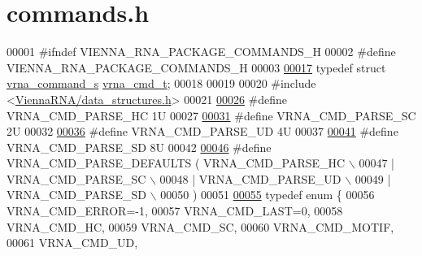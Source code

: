 \hypertarget{commands_8h_source}{}\section{commands.\+h}
\label{commands_8h_source}

\begin{DoxyCode}
00001 \textcolor{preprocessor}{#ifndef VIENNA\_RNA\_PACKAGE\_COMMANDS\_H}
00002 \textcolor{preprocessor}{#define VIENNA\_RNA\_PACKAGE\_COMMANDS\_H}
00003 
\hypertarget{commands_8h_source.tex_l00017}{}\hyperlink{group__file__utils_ga92cb3b5952352b103bcb32e5a99e0e5a}{00017} \textcolor{keyword}{typedef} \textcolor{keyword}{struct }\hyperlink{structvrna__command__s}{vrna\_command\_s} \hyperlink{structvrna__command__s}{vrna\_cmd\_t};
00018 
00019 
00020 \textcolor{preprocessor}{#include <\hyperlink{data__structures_8h}{ViennaRNA/data\_structures.h}>}
00021 
\hypertarget{commands_8h_source.tex_l00026}{}\hyperlink{commands_8h_ac54dec838d7b6bebd5df85f71702d324}{00026} \textcolor{preprocessor}{#define VRNA\_CMD\_PARSE\_HC      1U}
00027 
\hypertarget{commands_8h_source.tex_l00031}{}\hyperlink{commands_8h_a8cad3c1f83e6f149829c49a186a83e21}{00031} \textcolor{preprocessor}{#define VRNA\_CMD\_PARSE\_SC      2U}
00032 
\hypertarget{commands_8h_source.tex_l00036}{}\hyperlink{commands_8h_a6c6409780698826b04ebfed9151d7649}{00036} \textcolor{preprocessor}{#define VRNA\_CMD\_PARSE\_UD      4U}
00037 
\hypertarget{commands_8h_source.tex_l00041}{}\hyperlink{commands_8h_af5e20210173cdb83bf70256a454f284b}{00041} \textcolor{preprocessor}{#define VRNA\_CMD\_PARSE\_SD      8U}
00042 
\hypertarget{commands_8h_source.tex_l00046}{}\hyperlink{commands_8h_a0a6c88e21e366dca14958d69cd024008}{00046} \textcolor{preprocessor}{#define VRNA\_CMD\_PARSE\_DEFAULTS (   VRNA\_CMD\_PARSE\_HC \(\backslash\)}
00047 \textcolor{preprocessor}{                                  | VRNA\_CMD\_PARSE\_SC \(\backslash\)}
00048 \textcolor{preprocessor}{                                  | VRNA\_CMD\_PARSE\_UD \(\backslash\)}
00049 \textcolor{preprocessor}{                                  | VRNA\_CMD\_PARSE\_SD \(\backslash\)}
00050 \textcolor{preprocessor}{                                )}
00051 
\hypertarget{commands_8h_source.tex_l00055}{}\hyperlink{commands_8h_a2ea3e452bf3b3f3ca513b3b081a86137}{00055} \textcolor{keyword}{typedef} \textcolor{keyword}{enum} \{
00056   VRNA\_CMD\_ERROR=-1,
00057   VRNA\_CMD\_LAST=0,
00058   VRNA\_CMD\_HC,
00059   VRNA\_CMD\_SC,
00060   VRNA\_CMD\_MOTIF,
00061   VRNA\_CMD\_UD,

\end{DoxyCode}

